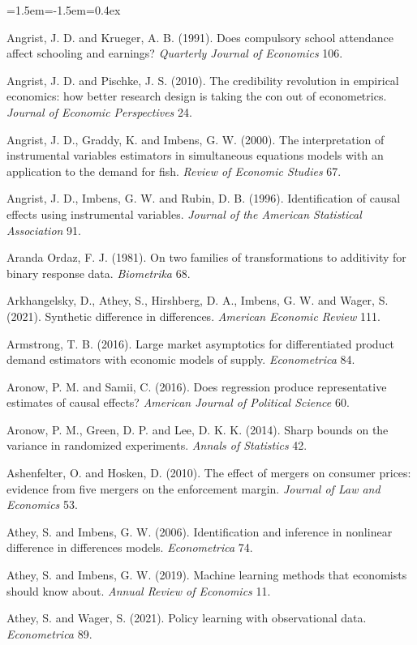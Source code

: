 \begin{list}{}{\leftmargin=1.5em\itemindent=-1.5em\itemsep=0.4ex}
\item Angrist, J. D. and Krueger, A. B. (1991). Does compulsory school attendance affect schooling and earnings? \emph{Quarterly Journal of Economics} 106.
\item Angrist, J. D. and Pischke, J. S. (2010). The credibility revolution in empirical economics: how better research design is taking the con out of econometrics. \emph{Journal of Economic Perspectives} 24.
\item Angrist, J. D., Graddy, K. and Imbens, G. W. (2000). The interpretation of instrumental variables estimators in simultaneous equations models with an application to the demand for fish. \emph{Review of Economic Studies} 67.
\item Angrist, J. D., Imbens, G. W. and Rubin, D. B. (1996). Identification of causal effects using instrumental variables. \emph{Journal of the American Statistical Association} 91.
\item Aranda Ordaz, F. J. (1981). On two families of transformations to additivity for binary response data. \emph{Biometrika} 68.
\item Arkhangelsky, D., Athey, S., Hirshberg, D. A., Imbens, G. W. and Wager, S. (2021). Synthetic difference in differences. \emph{American Economic Review} 111.
\item Armstrong, T. B. (2016). Large market asymptotics for differentiated product demand estimators with economic models of supply. \emph{Econometrica} 84.
\item Aronow, P. M. and Samii, C. (2016). Does regression produce representative estimates of causal effects? \emph{American Journal of Political Science} 60.
\item Aronow, P. M., Green, D. P. and Lee, D. K. K. (2014). Sharp bounds on the variance in randomized experiments. \emph{Annals of Statistics} 42.
\item Ashenfelter, O. and Hosken, D. (2010). The effect of mergers on consumer prices: evidence from five mergers on the enforcement margin. \emph{Journal of Law and Economics} 53.
\item Athey, S. and Imbens, G. W. (2006). Identification and inference in nonlinear difference in differences models. \emph{Econometrica} 74.
\item Athey, S. and Imbens, G. W. (2019). Machine learning methods that economists should know about. \emph{Annual Review of Economics} 11.
\item Athey, S. and Wager, S. (2021). Policy learning with observational data. \emph{Econometrica} 89.

\end{list}
